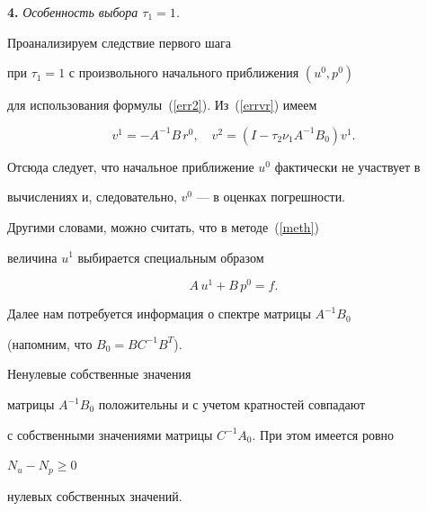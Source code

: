 {\bf 4.} {\it Особенность выбора $\tau_1=1$.}


Проанализируем следствие первого шага


при $\tau_1=1$ с произвольного начального приближения $(u^0,p^0)$


для использования формулы~(\ref{err2}). Из~(\ref{errvr}) имеем


\begin{equation}


\label{v1v2}


v^1 = - A^{-1} B\,r^0, \quad v^2 = ( I - \tau_2 \nu_1 A^{-1}B_0)v^1.


\end{equation}


Отсюда следует, что начальное приближение $u^0$ фактически не участвует в


вычислениях и, следовательно, $v^0$ --- в оценках погрешности.


Другими словами, можно считать, что в методе~(\ref{meth})


величина $u^1$ выбирается специальным образом


\begin{equation}


\label{init}


A\,u^1 + B\,p^0 = f.


\end{equation}





Далее нам потребуется информация о спектре матрицы $A^{-1}B_0$


(напомним, что $B_{0} = B C^{-1} B^T$).





\begin{lem}


Ненулевые собственные значения


матрицы $A^{-1}B_0$ положительны и с учетом кратностей совпадают


с собственными значениями матрицы $C^{-1}A_0$. При этом имеется ровно


$ N_u - N_p \geq 0 $


нулевых собственных значений.


\end{lem}





